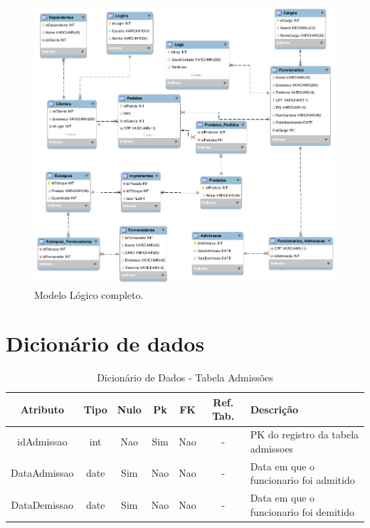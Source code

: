\documentclass[
	12pt,				%
	openright,			%
	oneside,			%
	a4paper,			%
	chapter=TITLE,		%
	section=TITLE,		%
	english,			%
	brazil				%
	]{abntex2}
\begin{document}
    \begin{figure}[h]
         \centering
         \includegraphics[width=17cm,keepaspectratio, angle=90]{Imgs/ML_00}
         \caption{Modelo Lógico completo.}
         \label{ml_00}
    \end{figure}

    \section{Dicionário de dados}
    
    \begin{table}[htbp]
    \centering
        \caption{Dicionário de Dados - Tabela Admissões}
        \label{tb1_dicionario_dados_admissoes}
        \begin{tabular}{|c|c|c|c|c|c|p{3cm}|}
            \hline 
            \textbf{Atributo} & 
            \textbf{Tipo} & 
            \textbf{Nulo} & 
            \textbf{Pk} & 
            \textbf{FK} & 
            \textbf{Ref. Tab.} & 
            \textbf{Descrição} \\ \hline
            idAdmissao & int & Nao & Sim & Nao & - & PK do registro da tabela admissoes \\ \hline
            DataAdmissao & date & Sim & Nao & Nao & - & Data em que o funcionario foi admitido \\ \hline
            DataDemissao & date & Sim & Nao & Nao & - & Data em que o funcionario foi demitido \\ \hline
        \end{tabular}        
    \end{table}
    
\end{document}
